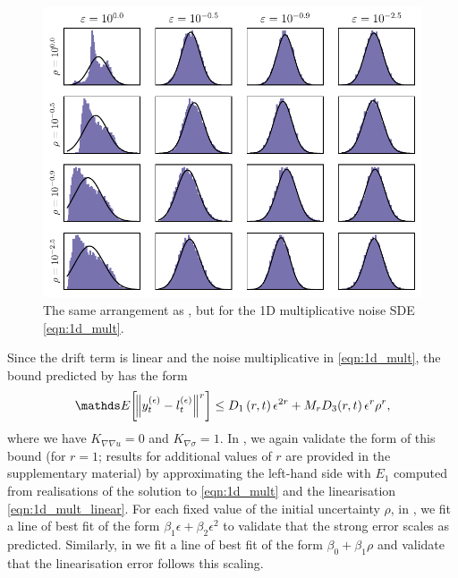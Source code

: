 \begin{figure}
	\begin{center}
    \includegraphics[width=\textwidth]{chp04_paper_numerics/figures/multiplicative/selected_hists.pdf}
		\caption{The same arrangement as , but for the 1D multiplicative noise SDE \eqref{eqn:1d_mult}.}
		\label{fig:1d_mult_hists}
	\end{center}
\end{figure}

Since the drift term is linear and the noise multiplicative in \eqref{eqn:1d_mult}, the bound predicted by  has the form
\[
	\avg{\norm{y_t^{(\epsilon)} - l_t^{(\epsilon)}}^r} \leq D_1\left(r, t\right)\epsilon^{2r} + M_{r}D_3\!\left(r,t\right)\epsilon^r\rho^{r},
\]
where we have \(K_{\nabla\nabla u} = 0\) and \(K_{\nabla\sigma} = 1\).
In , we again validate the form of this bound (for \(r = 1\); results for additional values of \(r\) are provided in the supplementary material) by approximating the left-hand side with \(E_1\) computed from realisations of the solution to \eqref{eqn:1d_mult} and the linearisation \eqref{eqn:1d_mult_linear}.
For each fixed value of the initial uncertainty \(\rho\), in , we fit a line of best fit of the form \(\beta_1 \epsilon + \beta_2 \epsilon^2\) to validate that the strong error scales as predicted.
Similarly, in  we fit a line of best fit of the form \(\beta_0 + \beta_1 \rho\) and validate that the linearisation error follows this scaling.

